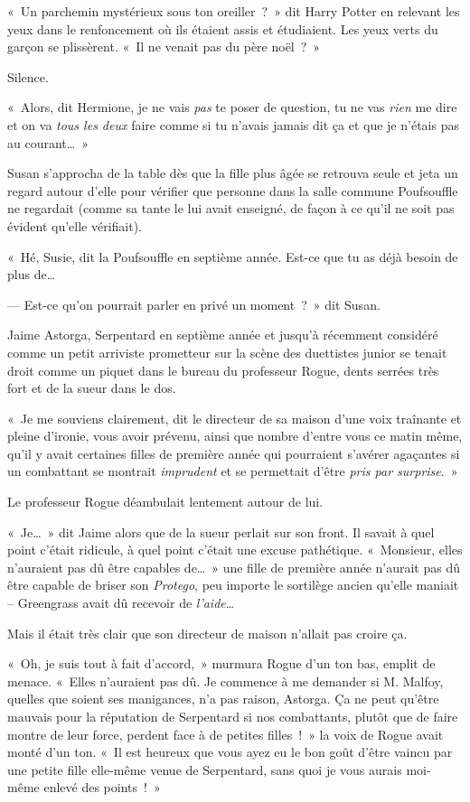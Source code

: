 \later

«~Un parchemin mystérieux sous ton oreiller~?~»
dit Harry Potter en relevant les yeux dans le renfoncement où ils étaient assis et étudiaient.
Les yeux verts du garçon se plissèrent.
«~Il ne venait pas du père noël~?~»

Silence.

«~Alors, dit Hermione, je ne vais \emph{pas} te poser de question, tu ne vas \emph{rien} me dire et on va \emph{tous les deux} faire comme si tu n'avais jamais dit ça et que je n'étais pas au courant…~»

\later

Susan s'approcha de la table dès que la fille plus âgée se retrouva seule et jeta un regard autour d'elle pour vérifier que personne dans la salle commune Poufsouffle ne regardait (comme sa tante le lui avait enseigné, de façon à ce qu'il ne soit pas évident qu'elle vérifiait).

«~Hé, Susie, dit la Poufsouffle en septième année.
Est-ce que tu as déjà besoin de plus de…

--- Est-ce qu'on pourrait parler en privé un moment~?~»
dit Susan.

\later

Jaime Astorga, Serpentard en septième année et jusqu'à récemment considéré comme un petit arriviste prometteur sur la scène des duettistes junior se tenait droit comme un piquet dans le bureau du professeur Rogue, dents serrées très fort et de la sueur dans le dos.

«~Je me souviens clairement, dit le directeur de sa maison d'une voix traînante et pleine d'ironie, vous avoir prévenu, ainsi que nombre d'entre vous ce matin même, qu'il y avait certaines filles de première année qui pourraient s'avérer agaçantes si un combattant se montrait \emph{imprudent} et se permettait d'être \emph{pris par surprise}.~»

Le professeur Rogue déambulait lentement autour de lui.

«~Je…~» dit Jaime alors que de la sueur perlait sur son front.
Il savait à quel point c'était ridicule, à quel point c'était une excuse pathétique.
«~Monsieur, elles n'auraient pas dû être capables de…~»
une fille de première année n'aurait pas dû être capable de briser son \emph{Protego}, peu importe le sortilège ancien qu'elle maniait -- Greengrass avait dû recevoir de \emph{l'aide}…

Mais il était très clair que son directeur de maison n'allait pas croire ça.

«~Oh, je suis tout à fait d'accord,~» murmura Rogue d'un ton bas, emplit de menace.
«~Elles n'auraient pas dû.
Je commence à me demander si M. Malfoy, quelles que soient ses manigances, n'a pas raison, Astorga.
Ça ne peut qu'être mauvais pour la réputation de Serpentard si nos combattants, plutôt que de faire montre de leur force, perdent face à de petites filles~!~»
la voix de Rogue avait monté d'un ton.
«~Il est heureux que vous ayez eu le bon goût d'être vaincu par une petite fille elle-même venue de Serpentard, sans quoi je vous aurais moi-même enlevé des points~!~»

